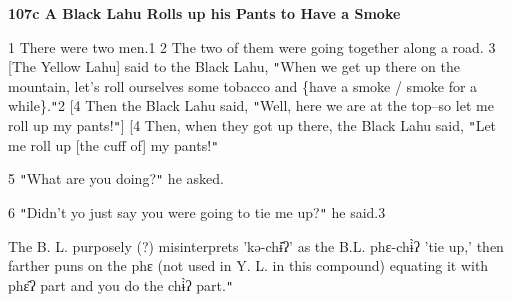
\textbf{107c A Black Lahu Rolls up his Pants to Have a Smoke }

1 There were two men.1 2 The two of them were going together along a road. 3 [The
Yellow Lahu] said to the Black Lahu, \texttt{"}When we get up there on the mountain,
let's roll ourselves some tobacco and \{have a smoke / smoke for a while\}.\texttt{"}2
[4 Then the Black Lahu said, \texttt{"}Well, here we are at the top--so let me
roll up my pants!\texttt{"}] [4 Then, when they got up there, the Black Lahu said,
\texttt{"}Let me roll up [the cuff of] my pants!\texttt{"}

5 \texttt{"}What are you doing?\texttt{"} he asked.

6 \texttt{"}Didn't yo just say you were going to tie me up?\texttt{"} he said.3

The B. L. purposely (?) misinterprets 'kə-chɨ̂ʔ' as the B.L. phɛ-chɨ̀ʔ
'tie up,' then farther puns on the phɛ (not used in Y. L. in this compound) equating
it with phɛ̂ʔ part and you do the chɨ̀ʔ part.\texttt{"}

